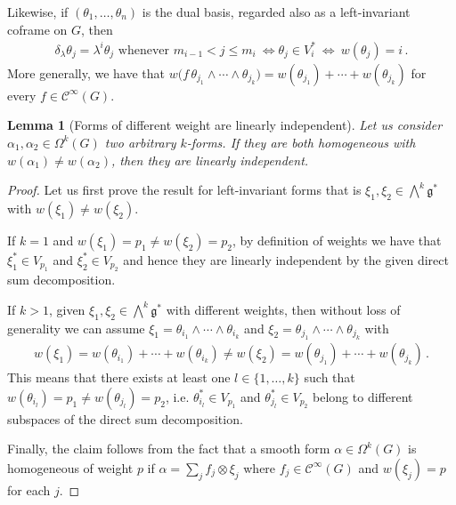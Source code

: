 \documentclass[dvipsnames]{amsart}
\newtheorem{lemma}[theorem]{Lemma}
\theoremstyle{definition}
\theoremstyle{definition}
\numberwithin{equation}{section}
\newcommand{\C}{\mathcal{C}}
\begin{document}
Likewise, if \((\theta_1,\ldots,\theta_n)\) is the dual basis,
regarded also as a left-invariant coframe on \(G\), then
\begin{align*}
    \delta_\lambda \theta_j=\lambda^i\theta_j \text{ whenever }m_{i-1}<j\le m_i\ \Longleftrightarrow \theta_j\in V_i^\ast\ \Longleftrightarrow\ w(\theta_j)=i\,.
\end{align*}
More generally, we have that $w\bigl(
f\,\theta_{j_1}\wedge\cdots\wedge\theta_{j_k}
\bigr)
=
w(\theta_{j_1})+\cdots+w(\theta_{j_k})$ for every $f\in\C^\infty(G)$. 
\begin{lemma}[Forms of different weight are linearly independent]\label{lem: different weights}
    Let us consider $\alpha_1,\alpha_2\in\Omega^k(G)$ two arbitrary $k$-forms. If they are both homogeneous with $w(\alpha_1)\neq w(\alpha_2)$, then they are linearly independent.
\end{lemma}
\begin{proof}
    
Let us first prove the result for left-invariant forms that is $\xi_1,\xi_2\in\bigwedge^k\mathfrak{g}^\ast$ with $w(\xi_1)\neq w(\xi_2)$.

    If $k=1$ and $w(\xi_1)=p_1\neq w(\xi_2)=p_2$, by definition of weights we have that $\xi_1^\ast\in V_{p_1}$ and $\xi_2^\ast\in V_{p_2}$ and hence they are linearly independent by the given direct sum decomposition.
    
    If $k>1$, given $\xi_1,\xi_2\in\bigwedge^k\mathfrak{g}^\ast$ with different weights, then without loss of generality we can assume $\xi_1=\theta_{i_1}\wedge\cdots\wedge\theta_{i_k}$ and $\xi_2=\theta_{j_1}\wedge\cdots\wedge\theta_{j_k}$ with
    \begin{align*}
        w(\xi_1)=w(\theta_{i_1})+\cdots+w(\theta_{i_k})\neq w(\xi_2)=w(\theta_{j_1})+\cdots+w(\theta_{j_k})\,. 
    \end{align*}
    This means that there exists at least one $l\in\{1,\ldots,k\}$ such that $w(\theta_{i_l})=p_1\neq w(\theta_{j_l})=p_2$, i.e. $\theta_{i_l}^\ast\in V_{p_1}$ and $\theta_{j_l}^\ast\in V_{p_2}$ belong to different subspaces of the direct sum decomposition.
    
    Finally, the claim follows from the fact that a smooth form $\alpha\in\Omega^k(G)$ is homogeneous of weight $p$ if $\alpha=\sum_{j}f_j\otimes\xi_j $ where $f_j\in \mathcal{C}^\infty(G)$ and $w(\xi_j)=p$ for each $j$.
\end{proof}
\end{document}
